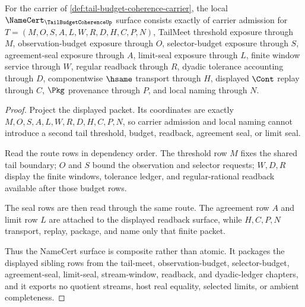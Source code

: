 \begin{theorem}
\label{thm:tail-budget-coherence-namecert-obligations}
For the carrier of \autoref{def:tail-budget-coherence-carrier}, the local $\NameCert_{\TailBudgetCoherenceUp}$ surface consists exactly of carrier admission for $T=(M,O,S,A,L,W,R,D,H,C,P,N)$, TailMeet threshold exposure through $M$, observation-budget exposure through $O$, selector-budget exposure through $S$, agreement-seal exposure through $A$, limit-seal exposure through $L$, finite window service through $W$, regular readback through $R$, dyadic tolerance accounting through $D$, componentwise $\hsame$ transport through $H$, displayed $\Cont$ replay through $C$, $\Pkg$ provenance through $P$, and local naming through $N$.
\end{theorem}
\begin{proof}
Project the displayed packet. Its coordinates are exactly $M,O,S,A,L,W,R,D,H,C,P,N$, so carrier admission and local naming cannot introduce a second tail threshold, budget, readback, agreement seal, or limit seal.

Read the route rows in dependency order. The threshold row $M$ fixes the shared tail boundary; $O$ and $S$ bound the observation and selector requests; $W,D,R$ display the finite windows, tolerance ledger, and regular-rational readback available after those budget rows.

The seal rows are then read through the same route. The agreement row $A$ and limit row $L$ are attached to the displayed readback surface, while $H,C,P,N$ transport, replay, package, and name only that finite packet.

Thus the NameCert surface is composite rather than atomic. It packages the displayed sibling rows from the tail-meet, observation-budget, selector-budget, agreement-seal, limit-seal, stream-window, readback, and dyadic-ledger chapters, and it exports no quotient streams, host real equality, selected limits, or ambient completeness.
\end{proof}

